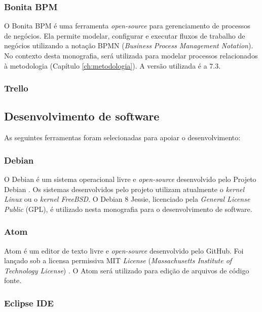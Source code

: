 \subsubsection{Bonita BPM}

O Bonita BPM é uma ferramenta \textit{open-source} para gerenciamento de processos de negócios. Ela permite modelar, configurar e executar fluxos de trabalho de negócios utilizando a notação BPMN (\textit{Business Process Management Notation}). No contexto desta monografia, será utilizada para modelar processos relacionados à metodologia (Capítulo \ref{ch:metodologia}). A versão utilizada é a 7.3.

\subsubsection{Trello}



\subsection{Desenvolvimento de software}

As seguintes ferramentas foram selecionadas para apoiar o desenvolvimento:

\subsubsection{Debian}

O Debian é um sistema operacional livre e \textit{open-source} desenvolvido pelo Projeto Debian \cite{debian2016}. Os sistemas desenvolvidos pelo projeto utilizam atualmente o \textit{kernel Linux} ou o \textit{kernel FreeBSD}. O Debian 8 Jessie, licenciado pela \textit{General License Public} (GPL), é utilizado nesta monografia para o desenvolvimento de software.

\subsubsection{Atom}

Atom é um editor de texto livre e \textit{open-source} desenvolvido pelo GitHub. Foi lançado sob a licensa permissiva MIT \textit{License} (\textit{Massachusetts Institute of Technology License}) \cite{atom2016}. O Atom será utilizado para edição de arquivos de código fonte.

\subsubsection{Eclipse IDE}


